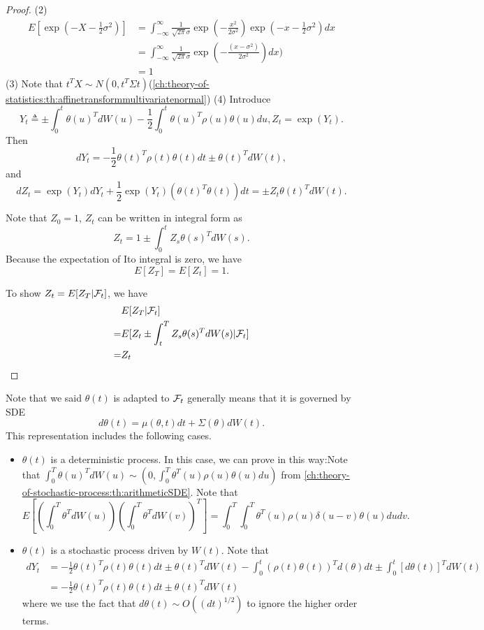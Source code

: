 \begin{refsection}
\begin{proof}
(2)
\begin{align*}
E[\exp(-X - \frac{1}{2}\sigma^2)] &=\int_{-\infty}^{\infty} \frac{1}{\sqrt{2\pi}\sigma} \exp(-\frac{x^2}{2\sigma^2})\exp(-x - \frac{1}{2}\sigma^2) dx\\
&=\int_{-\infty}^{\infty} \frac{1}{\sqrt{2\pi}\sigma} \exp(-\frac{(x - \sigma^2)}{2\sigma^2}) dx) \\
&= 1 
\end{align*}
(3) Note that $t^TX \sim N(0, t^T\Sigma t)$(\autoref{ch:theory-of-statistics:th:affinetransformmultivariatenormal})
(4) 
Introduce $$Y_t \triangleq \pm \int_0^t \theta(u)^T dW(u) -\frac{1}{2}\int_0^t \theta(u)^T \rho(u) \theta(u) du, Z_t = \exp(Y_t).$$
Then
$$dY_t = -\frac{1}{2} \theta(t)^T \rho(t) \theta(t) dt \pm \theta(t)^T dW(t),$$
and
$$dZ_t = \exp(Y_t)dY_t + \frac{1}{2}\exp(Y_t)(\theta(t)^T\theta(t)) dt = \pm Z_t\theta(t)^T dW(t).$$

Note that $Z_0 = 1$, $Z_t$ can be written in integral form as
$$Z_t = 1 \pm \int_0^t Z_s\theta(s)^T dW(s).$$
Because the expectation of Ito integral is zero, we have
$$E[Z_T] = E[Z_t] = 1.$$

To show $Z_t = E[Z_T|\mathcal{F}_t]$, we have
\begin{align*}
&E[Z_T|\mathcal{F}_t] \\
=&E[Z_t \pm \int_t^T Z_s\theta(s)^T dW(s)|\mathcal{F}_t] \\
=&Z_t
\end{align*}

\end{proof}


\begin{note}
Note that we said $\theta(t)$ is adapted to $\mathcal{F}_t$ generally means that it is governed by SDE
$$d\theta(t) = \mu(\theta,t)dt + \Sigma(\theta)dW(t).$$
This representation includes the following cases. 	
\begin{itemize}
	\item $\theta(t)$ is a deterministic process. In this case, we can prove in this way:Note that $\int_0^T \theta(u)^TdW(u) \sim (0, \int_0^T \theta^T(u) \rho(u)\theta(u)du)$ from \autoref{ch:theory-of-stochastic-process:th:arithmeticSDE}. Note that
	$$E[(\int_0^T \theta^T dW(u))(\int_0^T \theta^T dW(v))^T] = \int_0^T\int_0^T \theta^T(u) \rho(u)\delta(u-v)\theta(u)dudv.$$
	\item $\theta(t)$ is a stochastic process driven by $W(t)$. Note that
	\begin{align*}
		dY_t &= -\frac{1}{2} \theta(t)^T \rho(t) \theta(t) dt \pm \theta(t)^T dW(t) -\int_0^t (\rho(t) \theta(t))^T d(\theta)dt \pm \int_0^t [d\theta(t)]^T dW(t) \\
		&= -\frac{1}{2} \theta(t)^T \rho(t) \theta(t) dt \pm \theta(t)^T dW(t) 
	\end{align*}
 where we use the fact that $d\theta(t) \sim O((dt)^{1/2})$ to ignore the higher order terms.
\end{itemize}	
\end{note}




\end{refsection}
